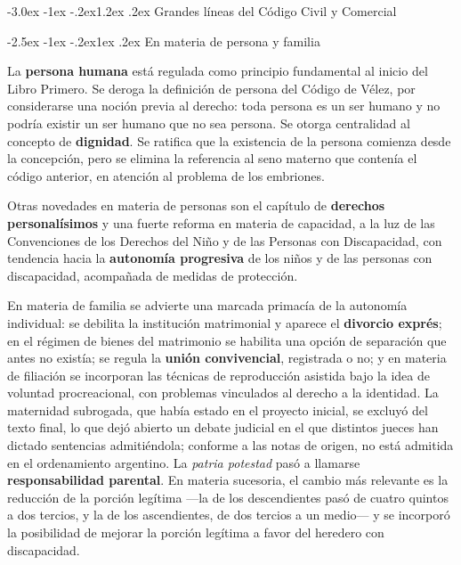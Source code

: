 \documentclass[12pt,oneside]{book}
\makeatletter
\renewcommand\section{\@startsection{section}{1}{\z@}%
  {-3.0ex \@plus -1ex \@minus -.2ex}{1.2ex \@plus .2ex}%
  {\normalfont\large\bfseries\color{acento}}}
\renewcommand\subsection{\@startsection{subsection}{2}{\z@}%
  {-2.5ex \@plus -1ex \@minus -.2ex}{1ex \@plus .2ex}%
  {\normalfont\normalsize\bfseries}}
\makeatother
\begin{document}
\section{Grandes líneas del Código Civil y Comercial}

\subsection{En materia de persona y familia}

La \textbf{persona humana} está regulada como principio fundamental al inicio del Libro Primero. Se deroga la definición de persona del Código de Vélez, por considerarse una noción previa al derecho: toda persona es un ser humano y no podría existir un ser humano que no sea persona. Se otorga centralidad al concepto de \textbf{dignidad}. Se ratifica que la existencia de la persona comienza desde la concepción, pero se elimina la referencia al seno materno que contenía el código anterior, en atención al problema de los embriones.

Otras novedades en materia de personas son el capítulo de \textbf{derechos personalísimos} y una fuerte reforma en materia de capacidad, a la luz de las Convenciones de los Derechos del Niño y de las Personas con Discapacidad, con tendencia hacia la \textbf{autonomía progresiva} de los niños y de las personas con discapacidad, acompañada de medidas de protección.

En materia de familia se advierte una marcada primacía de la autonomía individual: se debilita la institución matrimonial y aparece el \textbf{divorcio exprés}; en el régimen de bienes del matrimonio se habilita una opción de separación que antes no existía; se regula la \textbf{unión convivencial}, registrada o no; y en materia de filiación se incorporan las técnicas de reproducción asistida bajo la idea de voluntad procreacional, con problemas vinculados al derecho a la identidad. La maternidad subrogada, que había estado en el proyecto inicial, se excluyó del texto final, lo que dejó abierto un debate judicial en el que distintos jueces han dictado sentencias admitiéndola; conforme a las notas de origen, no está admitida en el ordenamiento argentino. %
La \textit{patria potestad} pasó a llamarse \textbf{responsabilidad parental}. En materia sucesoria, el cambio más relevante es la reducción de la porción legítima ---la de los descendientes pasó de cuatro quintos a dos tercios, y la de los ascendientes, de dos tercios a un medio--- y se incorporó la posibilidad de mejorar la porción legítima a favor del heredero con discapacidad.
\end{document}
